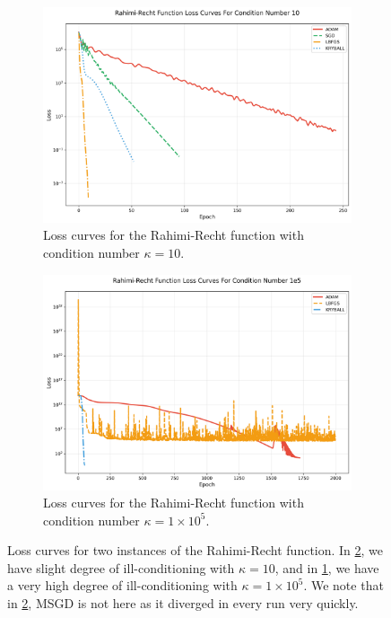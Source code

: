 \begin{figure}[!t]
    \begin{subfigure}[b]{0.49\linewidth}
        \centering
        \includegraphics[width=\linewidth]{figures/5evals/rr_losses_k_10.png}
        \caption{Loss curves for the Rahimi-Recht function with condition number $\kappa = 10$.}
        \label{fig:rr_losses_k_10}
    \end{subfigure}
    \hfill
    \begin{subfigure}[b]{0.49\linewidth}
        \centering
        \includegraphics[width=\linewidth]{figures/5evals/rr_losses_k_1e5.png}
        \caption{Loss curves for the Rahimi-Recht function with condition number $\kappa = 1 \times 10^5$.}
        \label{fig:rr_losses_k_1e5}
    \end{subfigure}
    \caption{Loss curves for two instances of the Rahimi-Recht function. In \cref{fig:rr_losses_k_1e5}, we have slight degree of ill-conditioning with $\kappa = 10$, and in \cref{fig:rr_losses_k_10}, we have a very high degree of ill-conditioning with $\kappa = 1 \times 10^5$. We note that in \cref{fig:rr_losses_k_1e5}, MSGD is not here as it diverged in every run very quickly.}
    \label{fig:rr_results}
\end{figure}

